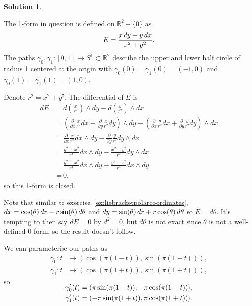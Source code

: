 \documentclass[11pt, a4paper]{report}
\theoremstyle{definition}
\newtheorem{solution}{Solution}[part]
\newenvironment{sol}{\begin{solution}}{\end{solution}\pagebreak[3]}
\newcommand*{\op}[1]{\ensuremath\mathop{}\mathopen{}#1}
\renewcommand*{\d}{\op{d}}
\begin{document}
\begin{sol}\label{sol:closedbutpathdependent}

The 1-form in question is defined on $\mathbb{R}^2 - \{0\}$ as
\[
    E = \frac{x \d y - y \d x}{x^2 + y^2}.
\]
The paths $\gamma_0, \gamma_1 : [0, 1] \to S^1 \subset \mathbb{R}^2$ describe the upper and lower half circle of radius 1 centered at the origin with $\gamma_0(0) = \gamma_1(0) = (-1, 0)$ and $\gamma_0(1) = \gamma_1(1) = (1, 0)$.

Denote $r^2 = x^2 + y^2$. The differential of $E$ is
\begin{align*}
    dE &= d \left(\frac{x}{r^2}\right) \wedge dy
          - d \left(\frac{y}{r^2} \right)\wedge dx \\
       &= \left(\frac{\partial}{\partial x} \frac{x}{r^2} dx
                + \frac{\partial}{\partial y} \frac{x}{r^2} dy\right) \wedge dy
          - \left(\frac{\partial}{\partial x} \frac{y}{r^2} dx
                  + \frac{\partial}{\partial y} \frac{y}{r^2} dy\right) \wedge dx \\
       &= \frac{\partial}{\partial x} \frac{x}{r^2} dx \wedge dy
          - \frac{\partial}{\partial y} \frac{y}{r^2} dy \wedge dx \\
       &= \frac{y^2 - x^2}{r^4} dx \wedge dy - \frac{x^2 - y^2}{r^4} dy \wedge dx \\
       &= \frac{y^2 - x^2}{r^4} dx \wedge dy - \frac{y^2 - x^2}{r^4} dx \wedge dy \\
       &= 0,
\end{align*}
so this 1-form is closed.

Note that similar to exercise~\ref{ex:liebracketpolarcoordinates}, $dx = \cos(\theta) \d r - r \sin(\theta) \d \theta$ and $dy = \sin(\theta) \d r + r \cos(\theta) \d \theta$ so $E = d \theta$. It's tempting to then say $dE = 0$ by $d^2 = 0$, but $d\theta$ is not exact since $\theta$ is not a well-defined 0-form, so the result doesn't follow.

We can parameterise our paths as
\begin{align*}
    \gamma_0: t &\mapsto (\cos(\pi(1 - t)), \sin(\pi(1 - t))), \\
    \gamma_1: t &\mapsto (\cos(\pi(1 + t)), \sin(\pi(1 + t))),
\end{align*}
so
\begin{align*}
    \SwapAboveDisplaySkip
    \gamma_0'(t) &= (\pi \sin(\pi(1 - t)), -\pi \cos(\pi(1 - t))), \\
    \gamma_1'(t) &= (-\pi \sin(\pi(1 + t)), \pi \cos(\pi(1 + t))).
\end{align*}


\end{sol}
\end{document}
